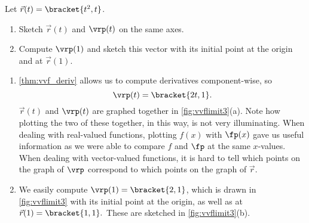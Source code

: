 \begin{example}\label{ex_vvflimit3}%
Let $\vec r(t) =\bracket{t^2,t}$. 
\begin{enumerate}
	\item Sketch $\vec r(t)$ and $\vrp(t)$ on the same axes.
	\item	Compute $\vrp(1)$ and sketch this vector with its initial point at the origin and at $\vec r(1)$.
\end{enumerate}
\solution
\begin{enumerate}
\item	\autoref{thm:vvf_deriv} allows us to compute derivatives component-wise, so
\[\vrp(t) =\bracket{2t, 1}.\]
$\vec r(t)$ and $\vrp(t)$ are graphed together in \autoref{fig:vvflimit3}(a). Note how plotting the two of these together, in this way, is not very illuminating. When dealing with real-valued functions, plotting $f(x)$ with $\fp(x)$ gave us useful information as we were able to compare $f$ and $\fp$ at the same $x$-values. When dealing with vector-valued functions, it is hard to tell which points on the graph of $\vrp$ correspond to which points on the graph of $\vec r$.

\item	We easily compute $\vrp(1) =\bracket{2,1}$, which is drawn in \autoref{fig:vvflimit3} with its initial point at the origin, as well as at $\vec r(1) =\bracket{1,1}.$ These are sketched in \autoref{fig:vvflimit3}(b).
\end{enumerate}
\end{example}

\iftoggle{in_threeD}{%
\mtable{Viewing a vector-valued function and its derivative at one point.}{fig:vvflimit4}{%
\myincludeasythree{
3Droll=-0.5856992334166129,
3Dortho=0.004399999976158142,
3Dc2c=0.6354137063026428 0.6317671537399292 0.4439816176891327,
3Dcoo=-18.837804794311523 -8.740551948547363 60.22870635986328,
3Droo=150.0000027221829}{.7\marginparwidth}{ALT-TEXT-TO-BE-DETERMINED}{figures/figvvflimit4_3D}}%
}{%
\mtable[-3\baselineskip]{Viewing a vector-valued function and its derivative at one point, from two different perspectives.}{fig:vvflimit4}{%
\myincludegraphics[alt={ALT-TEXT-TO-BE-DETERMINED},alt={ALT-TEXT-TO-BE-DETERMINED},width=.7\marginparwidth]{figures/figvvflimit4_3D}
\\(a)\\
\myincludegraphics[alt={ALT-TEXT-TO-BE-DETERMINED},alt={ALT-TEXT-TO-BE-DETERMINED},width=.7\marginparwidth]{figures/figvvflimit4a_3D}
\\(b)}%
}%

